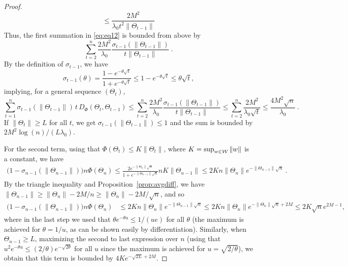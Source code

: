 \begin{proof}
\[	\le \frac{2 M^2}{\lambda_0 t^2 \|\Theta_{t-1}\|}
	\]
	Thus, the first summation in \eqref{eq:eq12} is bounded from above by
	\[
	\sum_{t=2}^n \frac{2 M^2}{\lambda_0} \frac{\sigma_{t-1}(\|\Theta_{t-1}\|)}{t \|\Theta_{t-1}\|}~.
	\]
	By the definition of $\sigma_{t-1}$, we have
	\[
	\sigma_{t-1}(\theta) = \frac{1-e^{-\theta\sqrt{t}}}{1+e^{-\theta \sqrt{t}}} \le 1-e^{-\theta\sqrt{t}} \le \theta \sqrt{t},
	\]
	implying, for a general sequence $(\Theta_t)$,
	\[
	\sum_{t=1}^n \sigma_{t-1}(\|\Theta_{t-1}\|)\, t\,D_{\Phi}(\Theta_t,\Theta_{t-1})
	\le \sum_{t=2}^n \frac{2 M^2}{\lambda_0} \frac{\sigma_{t-1}(\|\Theta_{t-1}\|)}{t \|\Theta_{t-1}\|}
	\le \sum_{t=2}^n \frac{2 M^2}{\lambda_0 \sqrt{t}} 
	\le \frac{4 M^2 \sqrt{n}}{\lambda_0}~.
	\]
	If $\|\Theta_{t}\| \ge L$ for all $t$, we get $\sigma_{t-1}(\|\Theta_{t-1}\|) \le 1$ and the sum is bounded by
	$2M^2 \log(n)/(L \lambda_0)$.
	
	
	For the second term, using that $\Phi(\Theta_t) \le K \|\Theta_t\|$, where $K = \sup_{w\in\mathcal{W}} \|w\|$ is a constant, we have
	\begin{align*}
	\big(1-\sigma_{n-1}(\|\Theta_{n-1}\|) \big) n\Phi(\Theta_n) 
	\le \frac{2 e^{-\|\Theta_{n}\| \sqrt{n}}}{1+e^{-\|\Theta_{n-1}\|\sqrt{n}}} n K \|\Theta_{n-1}\|
	\le 2 K n \|\Theta_{n}\| e^{-\|\Theta_{n-1}\| \sqrt{n}}~.
	\end{align*}
	By the triangle inequality and Proposition~\ref{prop:avgdiff}, we have
	$\|\Theta_{n-1}\| \ge \|\Theta_n\| - 2M/n \ge \|\Theta_n\| - 2M/\sqrt{n} $, and so
	\begin{align*}
	\big(1-\sigma_{n-1}(\|\Theta_{n-1}\|) \big) n\Phi(\Theta_n)
	& \le 2 K n \|\Theta_{n}\| e^{-\|\Theta_{n-1}\| \sqrt{n}}
	\le 2 K n \|\Theta_{n}\| e^{-\|\Theta_{n}\| \sqrt{n}+2M}
	\le 2 K \sqrt{n} e^{2M-1},
	\end{align*}
	where in the last step we used that $\theta e^{-\theta u} \le 1/(ue)$ for all $\theta$ (the maximum is achieved for $\theta=1/u$, as can be shown easily by differentiation). Similarly, when $\Theta_{n-1} \ge L$, maximizing the second to last expression over $n$ (using that $u^2 e^{-\theta u}\le (2/\theta) e^{-\sqrt{2 \theta}}$  for all $u$ since the maximum is achieved for $u=\sqrt{2/\theta}$), we obtain that this term is bounded by $4 K e^{-\sqrt{2 L}+2M}$.
	

\end{proof}

